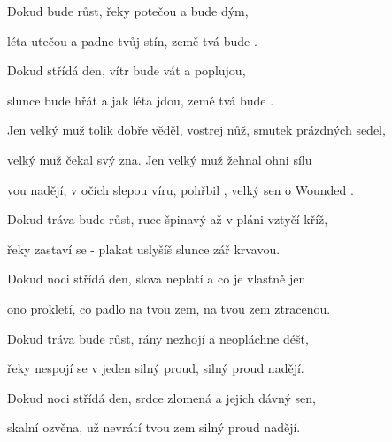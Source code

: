 

\zs
Dokud  bude růst,
řeky potečou a  bude dým,

léta utečou a  padne tvůj stín,
země tvá bude .

Dokud  střídá den,
vítr bude vát a  poplujou,

slunce bude hřát a  jak léta jdou,
země tvá bude .
\ks

\zr
Jen  velký muž tolik dobře věděl,
 vostrej nůž, smutek prázdných sedel,

 velký muž čekal svý zna.
Jen  velký muž žehnal ohni sílu

vou nadějí, v očích slepou víru,
 pohřbil , velký sen o Wounded .
\kr

\zs
Dokud tráva bude růst,
ruce špinavý až v pláni vztyčí kříž,

řeky zastaví se - plakat uslyšíš
slunce zář krvavou.

Dokud noci střídá den,
slova neplatí a co je vlastně jen

ono prokletí, co padlo na tvou zem,
na tvou zem ztracenou.
\ks

\zr  \kr

\zs
Dokud tráva bude růst,
rány nezhojí a neopláchne déšť,

řeky nespojí se v jeden silný proud,
silný proud nadějí.

Dokud noci střídá den,
srdce zlomená a jejich dávný sen,

skalní ozvěna, už nevrátí tvou zem
silný proud nadějí.
\ks

\zr  \kr

\kp





